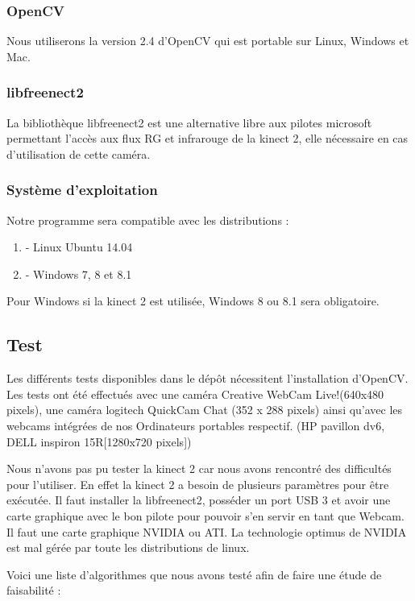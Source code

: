 \documentclass[12pt,a4paper]{article}
\begin{document}
\subsubsection{OpenCV}

Nous utiliserons la version 2.4 d'OpenCV qui est portable sur Linux, Windows et Mac.

\subsubsection{libfreenect2}

La bibliothèque libfreenect2 est une alternative libre aux pilotes microsoft permettant l'accès aux flux RG et infrarouge de la kinect 2, elle nécessaire en cas d'utilisation de cette caméra.


\subsubsection{Système d'exploitation}

Notre programme sera compatible avec les distributions : 
\begin{enumerate}
\item[] - Linux Ubuntu 14.04
\item[] - Windows 7, 8 et 8.1
\end{enumerate}
Pour Windows si la kinect 2 est utilisée, Windows 8 ou 8.1 sera obligatoire.

\subsection{Test}
Les différents tests disponibles dans le dépôt nécessitent l'installation d'OpenCV.
Les tests ont été effectués avec une caméra Creative WebCam Live!(640x480 pixels), une caméra logitech QuickCam Chat (352 x 288 pixels) ainsi qu'avec les webcams intégrées de nos Ordinateurs portables respectif. (HP pavillon dv6, DELL inspiron 15R[1280x720 pixels])

Nous n'avons pas pu tester la kinect 2 car nous avons rencontré des difficultés pour l'utiliser. En effet la kinect 2 a besoin de plusieurs paramètres pour être exécutée.
Il faut installer la libfreenect2, posséder un port USB 3 et avoir une carte graphique avec le bon pilote pour pouvoir s'en servir en tant que Webcam.
Il faut une carte graphique NVIDIA ou ATI. La technologie optimus de NVIDIA est mal gérée par toute les distributions de linux. 

Voici une liste d'algorithmes que nous avons testé afin de faire une étude de faisabilité : 
\end{document}
